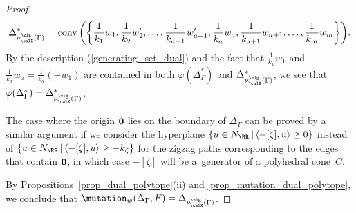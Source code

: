\begin{proof}
\begin{displaymath}
\Delta_{\nu^\zig_\calX(\Gamma)}^*=\operatorname{conv}\bigg(\bigg\{\frac{1}{k_1}w_1,\frac{1}{k_2}w_2^\prime,\dots,\frac{1}{k_{a-1}}w_{a-1}^\prime,
\frac{1}{k_a}w_a, \frac{1}{k_{a+1}}w_{a+1}, \dots,\frac{1}{k_m}w_m\bigg\}\bigg).
\end{displaymath}
By the description (\ref{generating_set_dual}) and the fact that $\frac{1}{k_1}w_1$ and $\frac{1}{k_a}w_a=\frac{1}{k_a}(-w_1)$ are contained in both $\varphi(\Delta_\Gamma^*)$ and $\Delta_{\nu^\zig_\calX(\Gamma)}^*$, we see that $\varphi(\Delta_\Gamma^*)=\Delta_{\nu^\zig_\calX(\Gamma)}^*$.

The case where the origin ${\bf 0}$ lies on the boundary of $\Delta_\Gamma$ can be proved by a similar argument if we consider the hyperplane $\{u\in N_\RR\,|\,\langle-[\zeta],u\rangle\ge 0\}$ instead of $\{u\in N_\RR\,|\,\langle-[\zeta],u\rangle\ge -k_\zeta\}$ for the zigzag paths corresponding to the edges that contain ${\bf 0}$, in which case $-[\zeta]$ will be a~generator of a polyhedral cone~$C$.

By Propositions~\ref{prop_dual_polytope}(ii) and \ref{prop_mutation_dual_polytope}, we conclude that
$\mutation_{w}(\Delta_\Gamma,F)=\Delta_{\nu^\zig_\calX(\Gamma)}$.
\end{proof}
